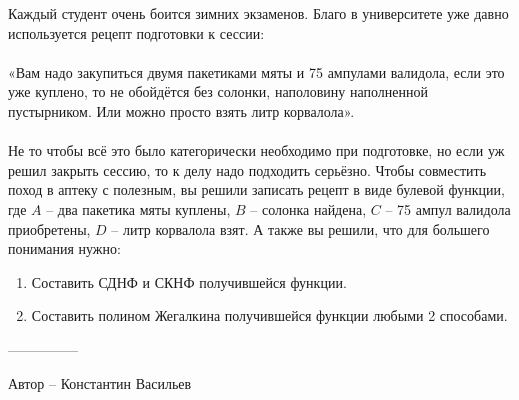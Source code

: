\question
Каждый студент очень боится зимних экзаменов. Благо в университете уже давно используется рецепт подготовки к сессии:
\\
\\
«Вам надо закупиться двумя пакетиками мяты и 75 ампулами валидола, если это уже куплено, то не обойдётся без солонки, наполовину наполненной пустырником. Или можно просто взять литр корвалола».
\\
\\
Не то чтобы всё это было категорически необходимо при подготовке, но если уж решил закрыть сессию, то к делу надо подходить серьёзно. Чтобы совместить поход в аптеку с полезным, вы решили записать рецепт в виде булевой функции, где $A$ – два пакетика мяты куплены, $B$ – солонка найдена, $C$ – 75 ампул валидола приобретены, $D$ – литр корвалола взят. А также вы решили, что для большего понимания нужно:
\begin{enumerate}
    \item Составить СДНФ и СКНФ получившейся функции.
    \item Составить полином Жегалкина получившейся функции любыми 2 способами.
\end{enumerate}

---------------

Автор -- Константин Васильев